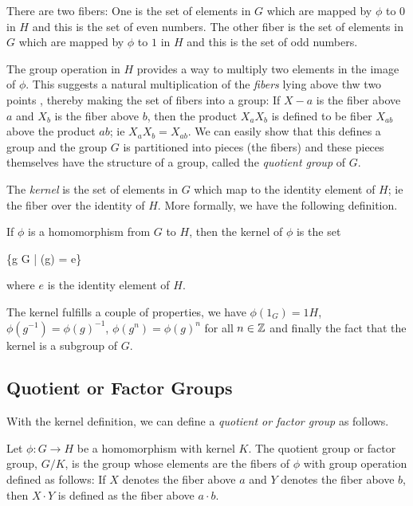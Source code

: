 There are two fibers: One is the set of elements in $G$ which are mapped by $\phi$ to $0$ in $H$ and this is the set of even numbers. The other fiber is the set of elements in $G$ which are mapped by $\phi$ to $1$ in $H$ and this is the set of odd numbers.

The group operation in $H$ provides a way to multiply two elements in the image of $\phi$. This suggests a natural multiplication of the \emph{fibers} lying above thw two points , thereby making the set of fibers into a group: If $X-a$ is the fiber above $a$ and $X_b$ is the fiber above $b$, then the product $X_a X_b$ is defined to be fiber $X_{ab}$ above the product $ab$; ie $X_a X_b = X_{ab}$. We can easily show that this defines a group and the group $G$ is partitioned into pieces (the fibers) and these pieces themselves have the structure of a group, called the \emph{quotient group} of $G$.

The \emph{kernel} is the set of elements in $G$ which map to the identity element of $H$; ie the fiber over the identity of $H$. More formally, we have the following definition.

\begin{definition}
If $\phi$ is a homomorphism from $G$ to $H$, then the kernel of $\phi$ is the set

\bee
\{g \in G | \phi(g) = e\}
\eee

where $e$ is the identity element of $H$.
\end{definition}

The kernel fulfills a couple of properties, we have $\phi(1_G) = 1H$, $\phi(g^{-1}) = \phi(g)^{-1}$, $\phi(g^n) = \phi(g)^n$ for all $n \in \mathbb{Z}$ and finally the fact that the kernel is a subgroup of $G$.

\subsection{Quotient or Factor Groups}

With the kernel definition, we can define a \emph{quotient or factor group} as follows.

\begin{definition}
Let $\phi: G \rightarrow H$ be a homomorphism with kernel $K$. The quotient group or factor group, $G/K$,  is the group whose elements are the fibers of $\phi$ with group operation defined as follows: If $X$ denotes the fiber above $a$ and $Y$ denotes the fiber above $b$, then $X \cdot Y$ is defined as the fiber above $a \cdot b$.
\end{definition}

